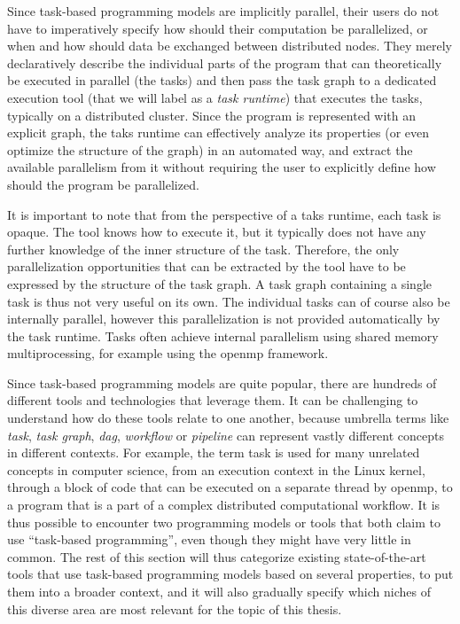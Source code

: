 Since task-based programming models are implicitly parallel, their users do not have to
imperatively specify how should their computation be parallelized, or when and how should data be
exchanged between distributed nodes. They merely declaratively describe the individual parts of the
program that can theoretically be executed in parallel (the tasks) and then pass the task graph to
a dedicated execution tool (that we will label as a \emph{task runtime}) that executes the tasks,
typically on a distributed cluster. Since the
program is represented with an explicit graph, the taks runtime can effectively analyze its
properties (or even optimize the structure of the graph) in an automated way, and extract the
available parallelism from it without requiring the user to explicitly define how should the
program be parallelized.

It is important to note that from the perspective of a taks runtime, each task is opaque.
The tool knows how to execute it, but it typically does not have any further knowledge of the inner
structure of the task. Therefore, the only parallelization opportunities that can be extracted by
the tool have to be expressed by the structure of the task graph. A task graph containing a single
task is thus not very useful on its own. The individual tasks can of course also be internally
parallel, however this parallelization is not provided automatically by the task runtime.
Tasks often achieve internal parallelism using shared memory multiprocessing, for example using the
\gls{openmp} framework.

Since task-based programming models are quite popular, there are hundreds of different tools and
technologies that leverage them. It can be challenging to understand how do these tools relate to
one another, because umbrella terms like \emph{task}, \emph{task graph},
\emph{\gls{dag}}, \emph{workflow} or \emph{pipeline} can represent vastly
different concepts in different contexts. For example, the term task is used for many unrelated
concepts in computer science, from an execution context in the Linux kernel, through a block of
code that can be executed on a separate thread by \gls{openmp}, to a program that is a
part of a complex distributed computational workflow. It is thus possible to encounter two
programming models or tools that both claim to use ``task-based programming'', even though they
might have very little in common. The rest of this section will thus categorize existing
state-of-the-art tools that use task-based programming models based on several properties, to put
them into a broader context, and it will also gradually specify which niches of this diverse area
are most relevant for the topic of this thesis.

